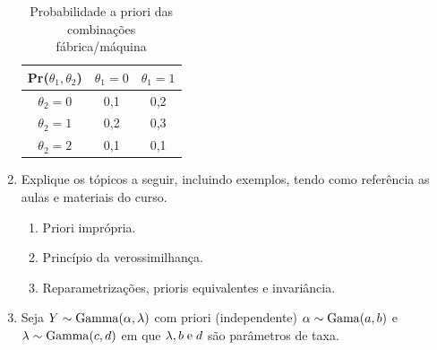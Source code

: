\documentclass[11pt,a4]{article}\usepackage[]{graphicx}\usepackage[]{xcolor}
\begin{document}
\begin{enumerate}
\begin{table}[ht!]
\centering
\caption{Probabilidade a priori das combinações fábrica/máquina}
\label{tab:exerc1b-cap4}
  \begin{tabular}{c| c c}
    Pr($\theta_1, \theta_2$)               &$\theta_1 = 0$          &$\theta_1 =1$\\
    \hline
    $\theta_2 = 0$                         &0,1                    &0,2\\
    $\theta_2 = 1$                         &0,2                    &0,3\\
    $\theta_2 = 2$                         &0,1                    &0,1\\
    \hline  
\end{tabular}
\end{table}



\item Explique os tópicos a seguir, incluindo exemplos, tendo como referência as aulas e materiais do curso.
\begin{enumerate}
  \item Priori imprópria.
  \item Princípio da verossimilhança.
  \item Reparametrizações, prioris equivalentes e invariância.
\end{enumerate}

  
\item Seja $Y \sim {\rm Gamma}(\alpha, \lambda)$ com priori (independente) $\alpha \sim {\rm Gama}(a, b)$ e $\lambda \sim {\rm Gamma}(c, d)$
  em que $\lambda, b \; {\rm e }\; d$ são parâmetros de taxa.


\end{enumerate}
\end{document}
